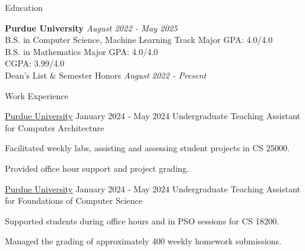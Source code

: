 \documentclass[
    11pt, %
]{resume} %
\begin{document}

\small
\begin{rSection}{Education}

    \textbf{Purdue University} \hfill \textit{August 2022 - May 2025} \\ 
    B.S. in Computer Science, Machine Learning Track \hfill Major GPA: 4.0/4.0 \\
    B.S. in Mathematics \hfill Major GPA: 4.0/4.0 \\
    \hspace*{\fill}  CGPA: 3.99/4.0 \\
    Dean's List \& Semester Honors \hfill {\em August 2022 - Present} 
    
\end{rSection}
\vspace*{-0.5cm}
\begin{rSection}{Work Experience}
    \begin{rSubsection}
        {\href{https://www.cs.purdue.edu/academic-programs/courses/canonical/cs250.html}
        {Purdue University}}
        {January 2024 - May 2024}
        {Undergraduate Teaching Assistant for Computer Architecture}{}

        \item Facilitated weekly labs, assisting and assessing student projects in CS 25000.
        \item Provided office hour support and project grading.
    \end{rSubsection}

    \begin{rSubsection}
        {\href{https://www.cs.purdue.edu/academic-programs/courses/canonical/cs182.html}
        {Purdue University}}
        {January 2024 - May 2024}
        {Undergraduate Teaching Assistant for Foundations of Computer Science}{}

        \item Supported students during office hours and in PSO sessions for CS 18200.
        \item Managed the grading of approximately 400 weekly homework submissions.
    \end{rSubsection}
\end{rSection}
\end{document}

